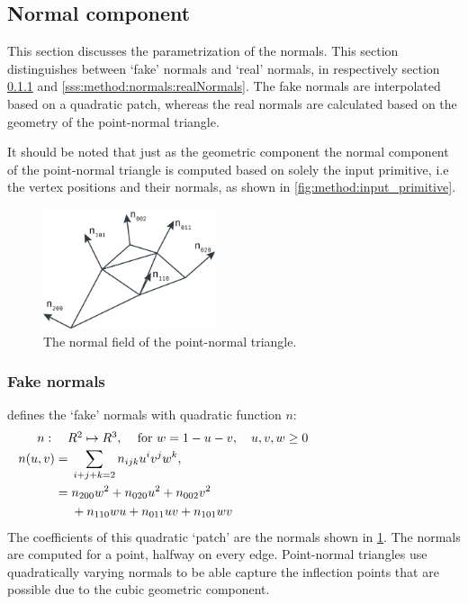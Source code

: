 
\subsection{Normal component}\label{ss:normal_component}
This section discusses the parametrization of the normals. This section distinguishes between `fake' normals and `real' normals, in respectively section \ref{sss:method:normals:fakeNormals} and \ref{sss:method:normals:realNormals}. The fake normals are interpolated based on a quadratic patch, whereas the real normals are calculated based on the geometry of the point-normal triangle. 

It should be noted that just as the geometric component the normal component of the point-normal triangle is computed based on solely  the input primitive, i.e the vertex positions and their normals, as shown in \cref{fig:method:input_primitive}. 

\begin{figure}
	\centering
	\includegraphics[width=0.45\textwidth]{./content/img/method/normals.png}
	\caption{The normal field of the point-normal triangle.}
	\label{fig:method:normal_field}
\end{figure}

\subsubsection{Fake normals}
\label{sss:method:normals:fakeNormals}
	\citeauthor{vlachos2001curved} defines the `fake' normals with quadratic function $n$:
	\begin{align}
	\noalign{$n: \quad R^2 \mapsto R^3,\quad$ for $w = 1 - u - v, \quad u, v, w \geq 0$}
	\begin{split}\label{eq:method:quadratic_normal_patch}
	    n(u,v) ={}& \sum_{i + j + k = 2} n_{ijk}u^i v^j w^k,\\
	      	   ={}& n_{200}w^2 + n_{020}u^2 + n_{002}v^2\\
	      	    {}& + n_{110}wu + n_{011}uv + n_{101}wv\\
	\end{split}
	\end{align}
	The coefficients of this quadratic `patch' are the normals shown in \cref{fig:method:normal_field}. The normals are computed for a point, halfway on every edge. Point-normal triangles use quadratically varying normals to be able capture the inflection points that are possible due to the cubic geometric component. 

